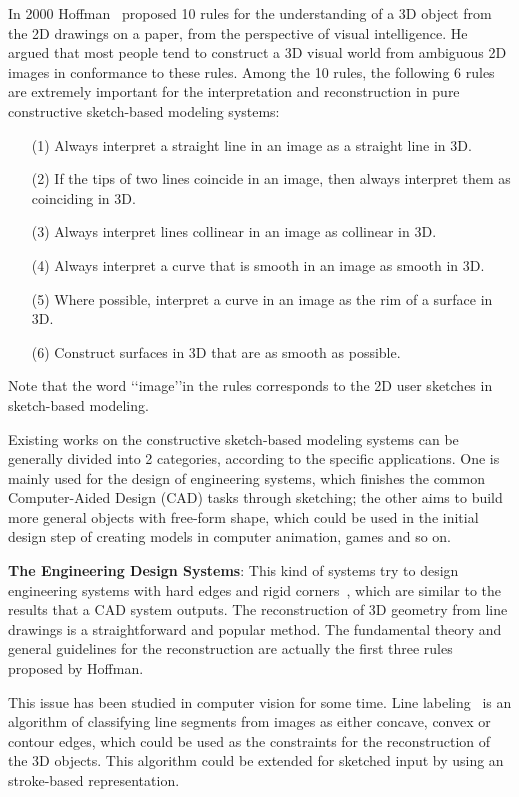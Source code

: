 In 2000 Hoffman~\cite{HD00} proposed 10 rules for the understanding of a 3D object from the 2D drawings on a paper, from the perspective of visual intelligence. He argued that most people tend to construct a 3D visual world from ambiguous 2D images in conformance to these rules. Among the 10 rules, the following 6 rules are extremely important for the interpretation and reconstruction in pure constructive sketch-based modeling systems:

\begin{enumerate}
	\item[(1)] Always interpret a straight line in an image as a straight line in 3D.
	\item[(2)] If the tips of two lines coincide in an image, then always interpret them as coinciding in 3D.
	\item[(3)] Always interpret lines collinear in an image as collinear in 3D.
	\item[(4)] Always interpret a curve that is smooth in an image as smooth in 3D.
	\item[(5)] Where possible, interpret a curve in an image as the rim of a surface in 3D.
	\item[(6)] Construct surfaces in 3D that are as smooth as possible.
\end{enumerate}

Note that the word \lq\lq{image}\rq\rq in the rules corresponds to the 2D user sketches in sketch-based modeling.

Existing works on the constructive sketch-based modeling systems can be generally divided into 2 categories, according to the specific applications. One is mainly used for the design of engineering systems, which finishes the common Computer-Aided Design (CAD) tasks through sketching; the other aims to build more general objects with free-form shape, which could be used in the initial design step of creating models in computer animation, games and so on.

\textbf{The Engineering Design Systems}: This kind of systems try to design engineering systems with hard edges and rigid corners~\cite{PD92,SG00,CNJC03,PYJH04,FBSS04,VMS05,ML07}, which are similar to the results that a CAD system outputs. The reconstruction of 3D geometry from line drawings is a straightforward and popular method. The fundamental theory and general guidelines for the reconstruction are actually the first three rules proposed by Hoffman.

This issue has been studied in computer vision for some time. Line labeling~\cite{MJ86} is an algorithm of classifying line segments from images as either concave, convex or contour edges, which could be used as the constraints for the reconstruction of the 3D objects. This algorithm could be extended for sketched input by using an stroke-based representation.

